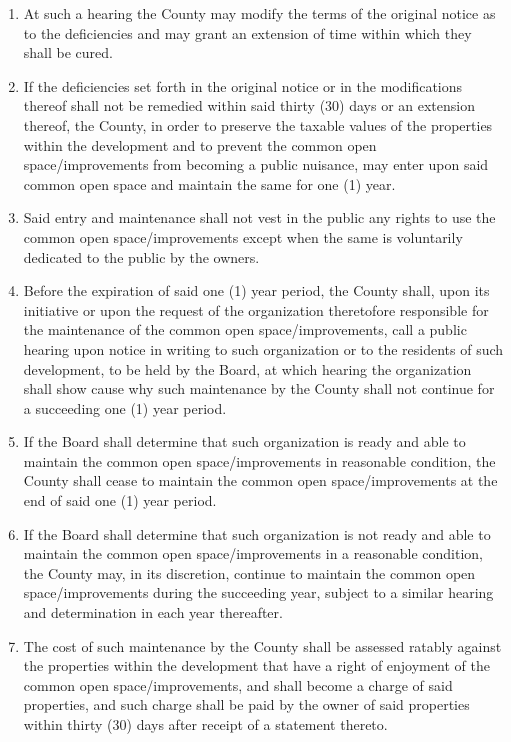 \documentclass[12pt, letterpaper]{article}
\begin{document}
\begin{enumerate}
\begin{enumerate}
 \item At such a hearing the County may modify the terms of the original notice as to the deficiencies and may grant an extension of time within which they shall be cured.
 \item If the deficiencies set forth in the original notice or in the modifications thereof shall not be remedied within said thirty (30) days or an extension thereof, the County, in order to preserve the taxable values of the properties within the development and to prevent the common open space/improvements from becoming a public nuisance, may enter upon said common open space and maintain the same for one (1) year.
 \item Said entry and maintenance shall not vest in the public any rights to use the common open space/improvements except when the same is voluntarily dedicated to the public by the owners.
 \item Before the expiration of said one (1) year period, the County shall, upon its initiative or upon the request of the organization theretofore responsible for the maintenance of the common open space/improvements, call a public hearing upon notice in writing to such organization or to the residents of such development, to be held by the Board, at which hearing the organization shall show cause why such maintenance by the County shall not continue for a succeeding one (1) year period.
 \item If the Board shall determine that such organization is ready and able to maintain the common open space/improvements in reasonable condition, the County shall cease to maintain the common open space/improvements at the end of said one (1) year period.
 \item If the Board shall determine that such organization is not ready and able to maintain the common open space/improvements in a reasonable condition, the County may, in its discretion, continue to maintain the common open space/improvements during the succeeding year, subject to a similar hearing and determination in each year thereafter.
 \item The cost of such maintenance by the County shall be assessed ratably against the properties within the development that have a right of enjoyment of the common open space/improvements, and shall become a charge of said properties, and such charge shall be paid by the owner of said properties within thirty (30) days after receipt of a statement thereto.
 \end{enumerate}
\end{enumerate}
\end{document}
